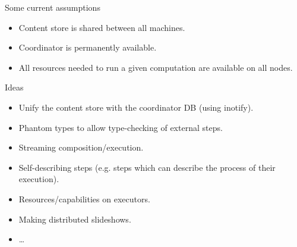 \documentclass[11pt]{beamer}
\begin{document}
\begin{frame}{Some current assumptions}
\begin{itemize}
\item Content store is shared between all machines.
\item Coordinator is permanently available.
\item All resources needed to run a given computation are available on all nodes.
\end{itemize}
\end{frame}

\begin{frame}{Ideas}
\begin{itemize}
\item Unify the content store with the coordinator DB (using inotify).
\item Phantom types to allow type-checking of external steps.
\item Streaming composition/execution.
\item Self-describing steps (e.g. steps which can describe the process of their execution).
\item Resources/capabilities on executors.
\item Making distributed slideshows.
\item \dots
\end{itemize}
\end{frame}
\end{document}
